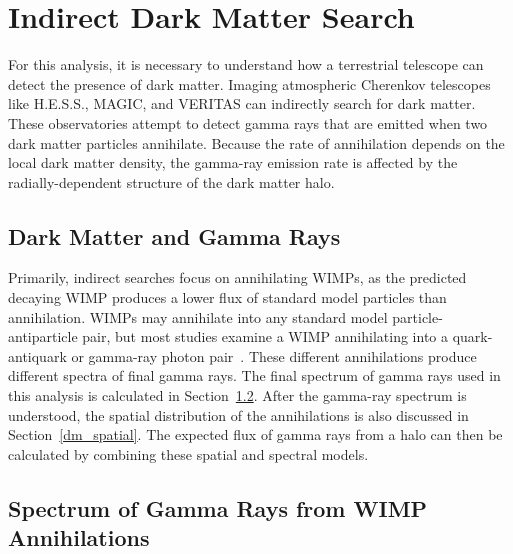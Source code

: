 \section{Indirect Dark Matter Search}
  For this analysis, it is necessary to understand how a terrestrial telescope can detect the presence of dark matter.
  Imaging atmospheric Cherenkov telescopes like H.E.S.S., MAGIC, and VERITAS can indirectly search for dark matter.
  These observatories attempt to detect gamma rays that are emitted when two dark matter particles annihilate.
  Because the rate of annihilation depends on the local dark matter density, the gamma-ray emission rate is affected by the radially-dependent structure of the dark matter halo.

  \subsection{Dark Matter and Gamma Rays}
    Primarily, indirect searches focus on annihilating WIMPs, as the predicted decaying WIMP produces a lower flux of standard model particles than annihilation.
    WIMPs may annihilate into any standard model particle-antiparticle pair, but most studies examine a WIMP annihilating into a quark-antiquark or gamma-ray photon pair~\cite{pdg2016}.
    These different annihilations produce different spectra of final gamma rays.
    The final spectrum of gamma rays used in this analysis is calculated in Section~\ref{dm_spectral}.
    After the gamma-ray spectrum is understood, the spatial distribution of the annihilations is also discussed in Section~\ref{dm_spatial}.
    The expected flux of gamma rays from a halo can then be calculated by combining these spatial and spectral models.
  
  \subsection{Spectrum of Gamma Rays from WIMP Annihilations}\label{dm_spectral}
    
    

